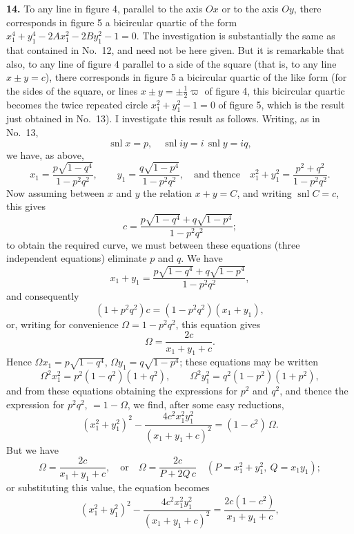 \documentclass[11pt,a4paper]{article}
\providecommand{\snl}{\operatorname{snl}}
\begin{document}
\textbf{14.} To any line in figure 4, parallel to the axis $Ox$ or to the axis $Oy$, there corresponds in figure 5 a bicircular quartic of the form $x_1^4 + y_1^4 - 2 A x_1^2 - 2 B y_1^2 - 1 = 0$. The investigation is substantially the same as that contained in No.~12, and need not be here given. But it is remarkable that also, to any line of figure 4 parallel to a side of the square (that is, to any line $x \pm y = c$), there corresponds in figure 5 a bicircular quartic of the like form (for the sides of the square, or lines $x \pm y = \pm\tfrac{1}{2}\varpi$ of figure 4, this bicircular quartic becomes the twice repeated circle $x_1^2 + y_1^2 - 1 = 0$ of figure 5, which is the result just obtained in No.~13). I investigate this result as follows. Writing, as in No.~13,
\[
\snl x = p, \quad \snl iy = i\,\snl y = iq,
\]
we have, as above,
\[
x_1 = \frac{p\sqrt{1 - q^4}}{1 - p^2 q^2}, \qquad y_1 = \frac{q\sqrt{1 - p^4}}{1 - p^2 q^2}, \quad \text{and thence} \quad x_1^2 + y_1^2 = \frac{p^2 + q^2}{1 - p^2 q^2}.
\]
Now assuming between $x$ and $y$ the relation $x + y = C$, and writing $\snl C = c$, this gives
\[
c = \frac{p\sqrt{1 - q^4} + q\sqrt{1 - p^4}}{1 - p^2 q^2};
\]
to obtain the required curve, we must between these equations (three independent equations) eliminate $p$ and $q$. We have
\[
x_1 + y_1 = \frac{p\sqrt{1 - q^4} + q\sqrt{1 - p^4}}{1 - p^2 q^2},
\]
and consequently
\[
(1 + p^2 q^2) c = (1 - p^2 q^2)(x_1 + y_1),
\]
or, writing for convenience $\Omega = 1 - p^2 q^2$, this equation gives
\[
\Omega = \frac{2c}{x_1 + y_1 + c}.
\]
Hence $\Omega x_1 = p\sqrt{1 - q^4}$, $\Omega y_1 = q\sqrt{1 - p^4}$; these equations may be written
\[
\Omega^2 x_1^2 = p^2(1 - q^2)(1 + q^2), \qquad \Omega^2 y_1^2 = q^2(1 - p^2)(1 + p^2),
\]
and from these equations obtaining the expressions for $p^2$ and $q^2$, and thence the expression for $p^2 q^2$, $= 1 - \Omega$, we find, after some easy reductions,
\[
(x_1^2 + y_1^2)^2 - \frac{4 c^2 x_1^2 y_1^2}{(x_1 + y_1 + c)^2} = (1 - c^2)\,\Omega.
\]
But we have
\[
\Omega = \frac{2c}{x_1 + y_1 + c}, \quad \text{or} \quad \Omega = \frac{2c}{P + 2Q\,c}\quad(P = x_1^2 + y_1^2,\ Q = x_1 y_1);
\]
or substituting this value, the equation becomes
\[
(x_1^2 + y_1^2)^2 - \frac{4 c^2 x_1^2 y_1^2}{(x_1 + y_1 + c)^2} = \frac{2c(1 - c^2)}{x_1 + y_1 + c},
\]
\end{document}
